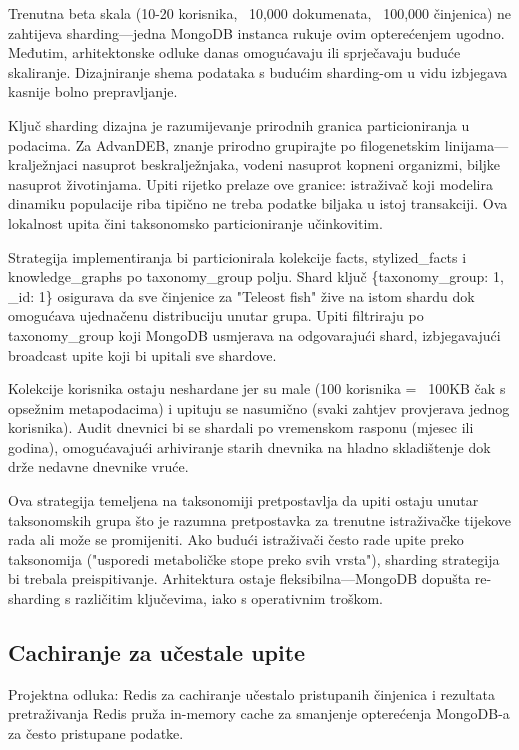 \documentclass[12pt,a4paper]{article}
\begin{document}
Trenutna beta skala (10-20 korisnika, ~10,000 dokumenata, ~100,000 činjenica) ne zahtijeva sharding—jedna MongoDB instanca rukuje ovim opterećenjem ugodno. Međutim, arhitektonske odluke danas omogućavaju ili sprječavaju buduće skaliranje. Dizajniranje shema podataka s budućim sharding-om u vidu izbjegava kasnije bolno prepravljanje.

Ključ sharding dizajna je razumijevanje prirodnih granica particioniranja u podacima. Za AdvanDEB, znanje prirodno grupirajte po filogenetskim linijama—kralježnjaci nasuprot beskralježnjaka, vodeni nasuprot kopneni organizmi, biljke nasuprot životinjama. Upiti rijetko prelaze ove granice: istraživač koji modelira dinamiku populacije riba tipično ne treba podatke biljaka u istoj transakciji. Ova lokalnost upita čini taksonomsko particioniranje učinkovitim.

Strategija implementiranja bi particionirala kolekcije facts, stylized\_facts i knowledge\_graphs po taxonomy\_group polju. Shard ključ \{taxonomy\_group: 1, \_id: 1\} osigurava da sve činjenice za "Teleost fish" žive na istom shardu dok omogućava ujednačenu distribuciju unutar grupa. Upiti filtriraju po taxonomy\_group koji MongoDB usmjerava na odgovarajući shard, izbjegavajući broadcast upite koji bi upitali sve shardove.

Kolekcije korisnika ostaju neshardane jer su male (100 korisnika = ~100KB čak s opsežnim metapodacima) i upituju se nasumično (svaki zahtjev provjerava jednog korisnika). Audit dnevnici bi se shardali po vremenskom rasponu (mjesec ili godina), omogućavajući arhiviranje starih dnevnika na hladno skladištenje dok drže nedavne dnevnike vruće.

Ova strategija temeljena na taksonomiji pretpostavlja da upiti ostaju unutar taksonomskih grupa što je razumna pretpostavka za trenutne istraživačke tijekove rada ali može se promijeniti. Ako budući istraživači često rade upite preko taksonomija ("usporedi metaboličke stope preko svih vrsta"), sharding strategija bi trebala preispitivanje. Arhitektura ostaje fleksibilna—MongoDB dopušta re-sharding s različitim ključevima, iako s operativnim troškom.

\subsection{Cachiranje za učestale upite}

\begin{rationale}{Projektna odluka: Redis za cachiranje učestalo pristupanih činjenica i rezultata pretraživanja}
Redis pruža in-memory cache za smanjenje opterećenja MongoDB-a za često pristupane podatke.
\end{rationale}
\end{document}
